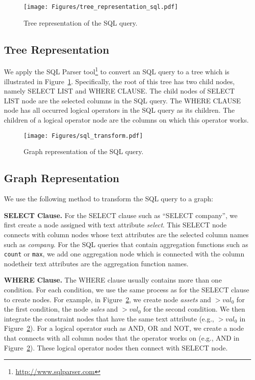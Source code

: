 \documentclass{article} \usepackage{iclr2019_conference,times}
\begin{document}
\begin{figure}[h]
\centering\texttt{[image: Figures/tree\_representation\_sql.pdf]}
\caption{Tree representation of the SQL query.}
\label{fig:tree_rep}
\vspace{-0.5cm}
\end{figure}
\subsection{Tree Representation}
We apply the SQL Parser tool\footnote{\url{http://www.sqlparser.com}} to convert an SQL query to a tree which is illustrated in Figure~\ref{fig:tree_rep}. Specifically, the root of this tree has two child nodes, namely SELECT LIST and WHERE CLAUSE. The child nodes of SELECT LIST node are the selected columns in the SQL query. The WHERE CLAUSE node has all occurred logical operators in the SQL query as its children. The children of a logical operator node are the columns on which this operator works. 


\begin{figure}[t!]
\centering\texttt{[image: Figures/sql\_transform.pdf]}
\caption{Graph representation of the SQL query.}
\label{fig:nlg_example_appendix}
\vspace{-0.5cm}
\end{figure}
\subsection{Graph Representation}
We use the following method to transform the SQL query to a graph:

\textbf{SELECT Clause.} For the SELECT clause such as ``SELECT company'', we first create a node assigned with text attribute \textit{select}. This SELECT node connects with column nodes whose text attributes are the selected column names such as \textit{company}.
For the SQL queries that contain aggregation functions such as \texttt{count} or \texttt{max}, we add one aggregation node which is connected with the column node\textemdash{}their text attributes are the aggregation function names.

\textbf{WHERE Clause.} The WHERE clause usually contains more than one condition.
For each condition, we use the same process as for the SELECT clause to create nodes.
For example, in Figure~\ref{fig:nlg_example_appendix}, we create node \textit{assets} and $>$\textit{$val_0$} for the first condition,
the node \textit{sales} and $>$\textit{$val_0$} for the second condition.
We then integrate the constraint nodes that have the same text attribute (e.g., $>$\textit{$val_0$} in Figure~\ref{fig:nlg_example_appendix}).
For a logical operator such as AND, OR and NOT,
we create a node that connects with all column nodes that the operator works on
(e.g., AND in Figure~\ref{fig:nlg_example_appendix}).
These logical operator nodes then connect with SELECT node.
\end{document}
